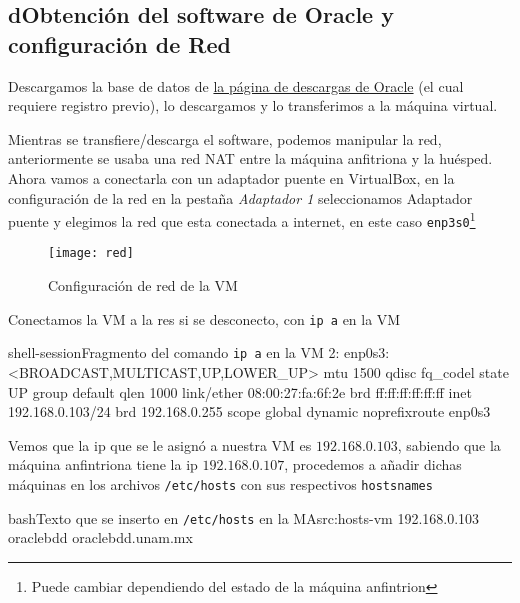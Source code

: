 \documentclass[./main.tex]{subfiles}
\begin{document}
\renewcommand{\thesubsubsection}{C\arabic{subsubsection}}

\subsection{dObtención del software de Oracle y configuración de Red}\label{sec:obtenc-del-soft}
Descargamos la base de datos de
\href{https://www.oracle.com/database/technologies/oracle-database-software-downloads.html}
{la página de descargas de Oracle} (el cual requiere registro previo), lo descargamos y lo
transferimos a la máquina virtual.


Mientras se transfiere/descarga el software, podemos manipular la red, anteriormente se usaba una
red NAT entre la máquina anfitriona y la huésped. Ahora vamos a conectarla con un adaptador puente
en VirtualBox, en la configuración de la red en la pestaña \textit{Adaptador 1} seleccionamos
Adaptador puente y elegimos la red que esta conectada a internet, en este caso \texttt{enp3s0}\footnote{Puede
  cambiar dependiendo del estado de la máquina anfintrion}
\begin{figure}[H]
  \centering
  \texttt{[image: red]}
  \caption{Configuración de red de la VM}\label{fig:red}
\end{figure}

Conectamos la VM a la res si se desconecto, con \texttt{ip a} en la VM
\begin{codeC}{shell-session}{Fragmento del comando \texttt{ip a} en la VM}
2: enp0s3: <BROADCAST,MULTICAST,UP,LOWER_UP> mtu 1500 qdisc fq_codel state UP group default qlen 1000
    link/ether 08:00:27:fa:6f:2e brd ff:ff:ff:ff:ff:ff
    inet 192.168.0.103/24 brd 192.168.0.255 scope global dynamic noprefixroute enp0s3
\end{codeC}

Vemos que la ip que se le asignó a nuestra VM es $192.168.0.103$, sabiendo que la máquina anfintriona
tiene la ip $192.168.0.107$, procedemos a añadir dichas máquinas en los archivos \texttt{/etc/hosts}
con sus respectivos \texttt{hostsnames}
\begin{codeCL}{bash}{Texto que se inserto en \texttt{/etc/hosts} en la MA}{src:hosts-vm}
192.168.0.103 oraclebdd oraclebdd.unam.mx
\end{codeCL}
\end{document}
